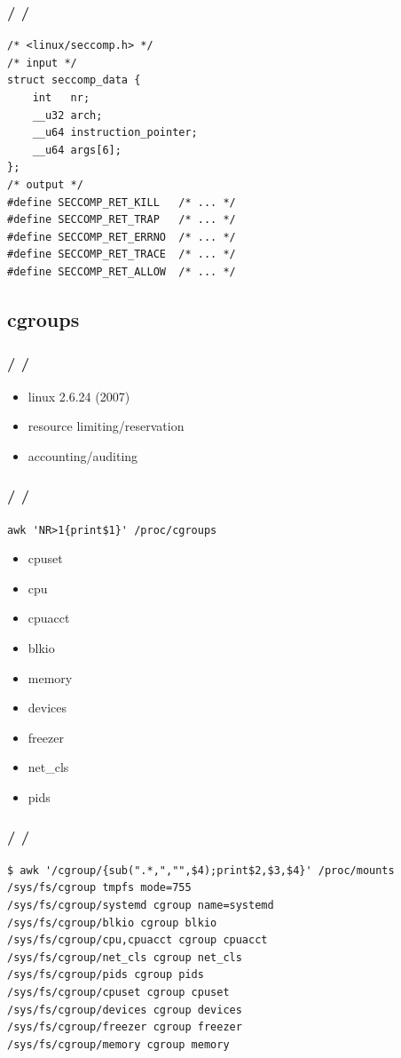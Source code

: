 \documentclass{beamer}
\newcommand{\autotitle}
{\frametitle{
    \secname
    \ifx\insertsubsection\empty
    \else
        /\subsecname
        \ifx\insertsubsubsection\empty\else/\subsubsecname\fi
    \fi}}
\begin{document}
\begin{frame}[fragile]
    \autotitle
    \begin{verbatim}
/* <linux/seccomp.h> */
/* input */
struct seccomp_data {
    int   nr;
    __u32 arch;
    __u64 instruction_pointer;
    __u64 args[6];
};
/* output */
#define SECCOMP_RET_KILL   /* ... */
#define SECCOMP_RET_TRAP   /* ... */
#define SECCOMP_RET_ERRNO  /* ... */
#define SECCOMP_RET_TRACE  /* ... */
#define SECCOMP_RET_ALLOW  /* ... */
    \end{verbatim}
\end{frame}

\subsection{cgroups}

\begin{frame}
    \autotitle
    \begin{itemize}
        \item linux 2.6.24 (2007)
        \item resource limiting/reservation
        \item accounting/auditing
    \end{itemize}
\end{frame}

\begin{frame}[fragile]
    \autotitle
    \verb|awk 'NR>1{print$1}' /proc/cgroups|
    \begin{multicols}{3}
        \begin{itemize}
            \item cpuset
            \item cpu
            \item cpuacct
            \item blkio
            \item memory
            \item devices
            \item freezer
            \item net\_cls
            \item pids
        \end{itemize}
    \end{multicols}
\end{frame}

\begin{frame}[fragile]
    \autotitle
    \begin{verbatim}
$ awk '/cgroup/{sub(".*,","",$4);print$2,$3,$4}' /proc/mounts
/sys/fs/cgroup tmpfs mode=755
/sys/fs/cgroup/systemd cgroup name=systemd
/sys/fs/cgroup/blkio cgroup blkio
/sys/fs/cgroup/cpu,cpuacct cgroup cpuacct
/sys/fs/cgroup/net_cls cgroup net_cls
/sys/fs/cgroup/pids cgroup pids
/sys/fs/cgroup/cpuset cgroup cpuset
/sys/fs/cgroup/devices cgroup devices
/sys/fs/cgroup/freezer cgroup freezer
/sys/fs/cgroup/memory cgroup memory
    \end{verbatim}
\end{frame}
\end{document}
